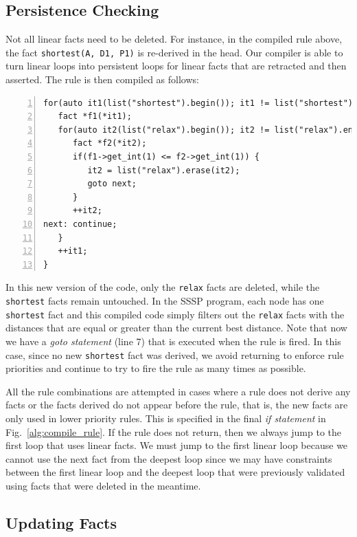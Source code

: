 \subsection{Persistence Checking}

Not all linear facts need to be deleted. For instance, in the compiled rule
above, the fact \texttt{shortest(A, D1, P1)} is re-derived in the head. Our
compiler is able to turn linear loops into persistent loops for linear facts
that are retracted and then asserted.  The rule is then compiled as follows:

\begin{Verbatim}[numbers=left,fontsize=\scriptsize,xleftmargin=\codemargin]
for(auto it1(list("shortest").begin()); it1 != list("shortest").end(); ) {
   fact *f1(*it1);
   for(auto it2(list("relax").begin()); it2 != list("relax").end(); ) {
      fact *f2(*it2);
      if(f1->get_int(1) <= f2->get_int(1)) {
         it2 = list("relax").erase(it2);
         goto next;
      }
      ++it2;
next: continue;
   }
   ++it1;
}
\end{Verbatim}

In this new version of the code, only the \texttt{relax} facts are deleted,
while the \texttt{shortest} facts remain untouched. In the SSSP program, each
node has one \texttt{shortest} fact and this compiled code simply filters out
the \texttt{relax} facts with the distances that are equal or greater than the
current best distance. Note that now we have a \emph{goto statement} (line 7)
that is executed when the rule is fired.  In this case, since no new
\texttt{shortest} fact was derived, we avoid returning to enforce rule
priorities and continue to try to fire the rule as many times as possible.

All the rule combinations are attempted in cases where a rule does not derive
any facts or the facts derived do not appear before the rule, that is, the new
facts are only used in lower priority rules. This is specified in the final
\emph{if statement} in Fig.~\ref{alg:compile_rule}. If the rule does not return,
then we always jump to the first loop that uses linear facts. We must jump to
the first linear loop because we cannot use the next fact from the deepest loop
since we may have constraints between the first linear loop and the deepest loop
that were previously validated using facts that were deleted in the meantime.

\subsection{Updating Facts}

